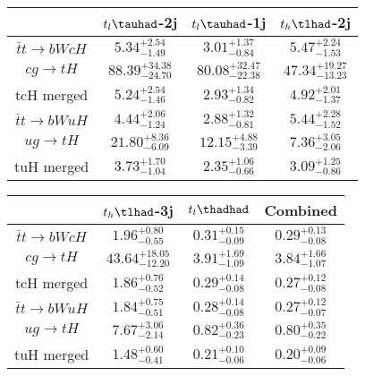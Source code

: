 \centering
\begin{tabular}{|c|c|c|c|} \hline
 & $t_l\tauhad$-2j & $t_l\tauhad$-1j & $t_h\tlhad$-2j\\\hline
$\bar{t}t\to bWcH$ & $5.34^{+2.54}_{-1.49}$ & $3.01^{+1.37}_{-0.84}$ & $5.47^{+2.24}_{-1.53}$\\\hline
$cg\to tH$ & $88.39^{+34.38}_{-24.70}$ & $80.08^{+32.47}_{-22.38}$ & $47.34^{+19.27}_{-13.23}$\\\hline
tcH merged & $5.24^{+2.54}_{-1.46}$ & $2.93^{+1.34}_{-0.82}$ & $4.92^{+2.01}_{-1.37}$\\\hline
$\bar{t}t\to bWuH$ & $4.44^{+2.06}_{-1.24}$ & $2.88^{+1.32}_{-0.81}$ & $5.44^{+2.28}_{-1.52}$\\\hline
$ug\to tH$ & $21.80^{+8.36}_{-6.09}$ & $12.15^{+4.88}_{-3.39}$ & $7.36^{+3.05}_{-2.06}$\\\hline
tuH merged & $3.73^{+1.70}_{-1.04}$ & $2.35^{+1.06}_{-0.66}$ & $3.09^{+1.25}_{-0.86}$\\\hline
\end{tabular}
\begin{tabular}{|c|c|c|c|} \hline
 & $t_h\tlhad$-3j & $t_l\thadhad$ & Combined\\\hline
$\bar{t}t\to bWcH$ & $1.96^{+0.80}_{-0.55}$ & $0.31^{+0.15}_{-0.09}$ & $0.29^{+0.13}_{-0.08}$\\\hline
$cg\to tH$ & $43.64^{+18.05}_{-12.20}$ & $3.91^{+1.69}_{-1.09}$ & $3.84^{+1.66}_{-1.07}$\\\hline
tcH merged & $1.86^{+0.76}_{-0.52}$ & $0.29^{+0.14}_{-0.08}$ & $0.27^{+0.12}_{-0.08}$\\\hline
$\bar{t}t\to bWuH$ & $1.84^{+0.75}_{-0.51}$ & $0.28^{+0.14}_{-0.08}$ & $0.27^{+0.12}_{-0.07}$\\\hline
$ug\to tH$ & $7.67^{+3.06}_{-2.14}$ & $0.82^{+0.36}_{-0.23}$ & $0.80^{+0.35}_{-0.22}$\\\hline
tuH merged & $1.48^{+0.60}_{-0.41}$ & $0.21^{+0.10}_{-0.06}$ & $0.20^{+0.09}_{-0.06}$\\\hline
\end{tabular}
